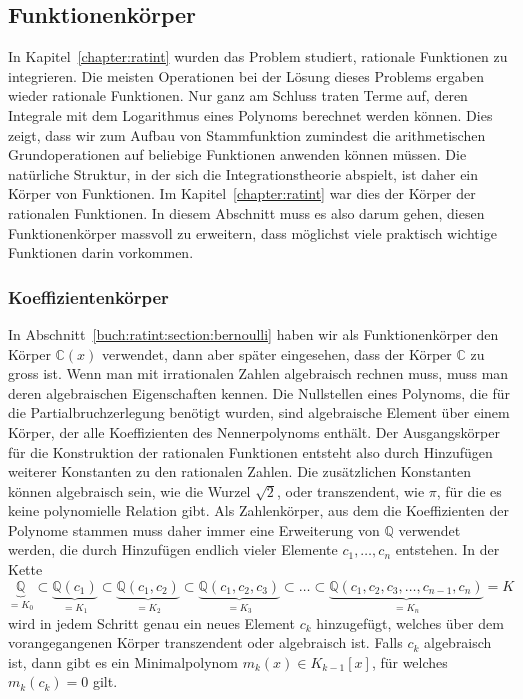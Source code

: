 %
%
\subsection{Funktionenkörper}
In Kapitel~\ref{chapter:ratint} wurden das Problem studiert,
rationale Funktionen zu integrieren.
Die meisten Operationen bei der Lösung dieses Problems ergaben
wieder rationale Funktionen.
Nur ganz am Schluss traten Terme auf, deren Integrale mit dem
Logarithmus eines Polynoms berechnet werden können.
Dies zeigt, dass wir zum Aufbau von Stammfunktion zumindest die
arithmetischen Grundoperationen auf beliebige Funktionen anwenden können
müssen.
Die natürliche Struktur, in der sich die Integrationstheorie
abspielt, ist daher ein Körper von Funktionen.
Im Kapitel~\ref{chapter:ratint} war dies der Körper der rationalen
Funktionen.
In diesem Abschnitt muss es also darum gehen, diesen Funktionenkörper
massvoll zu erweitern, dass möglichst viele praktisch wichtige
Funktionen darin vorkommen.

%
%
\subsubsection{Koeffizientenkörper}
In Abschnitt~\ref{buch:ratint:section:bernoulli} haben wir als
Funktionenkörper den Körper $\mathbb{C}(x)$ verwendet, dann
aber später eingesehen, dass der Körper $\mathbb{C}$ zu gross ist.
Wenn man mit irrationalen Zahlen algebraisch rechnen muss, muss
man deren algebraischen Eigenschaften kennen.
Die Nullstellen eines Polynoms, die für die Partialbruchzerlegung
benötigt wurden, sind algebraische Element über einem Körper, der
alle Koeffizienten des Nennerpolynoms enthält.
Der Ausgangskörper für die Konstruktion der rationalen Funktionen
entsteht also durch Hinzufügen weiterer Konstanten zu den rationalen
Zahlen.
Die zusätzlichen Konstanten können algebraisch sein, wie die
Wurzel $\!\sqrt{2}$, oder transzendent, wie $\pi$, für die es keine
polynomielle Relation gibt.
Als Zahlenkörper, aus dem die Koeffizienten der Polynome stammen
muss daher immer eine Erweiterung von $\mathbb{Q}$ verwendet werden,
die durch Hinzufügen endlich vieler Elemente $c_1,\dots,c_n$ entstehen.
In der Kette
\[
\underbrace{\mathbb{Q}}_{\displaystyle = K_0}
\subset
\underbrace{\mathbb{Q}(c_1)}_{\displaystyle = K_1}
\subset
\underbrace{\mathbb{Q}(c_1,c_2)}_{\displaystyle = K_2}
\subset
\underbrace{\mathbb{Q}(c_1,c_2,c_3)}_{\displaystyle = K_3}
\subset
\ldots
\subset
\underbrace{\mathbb{Q}(c_1,c_2,c_3,\ldots,c_{n-1},c_n)}_{\displaystyle = K_n}
=
K
\]
wird in jedem Schritt genau ein neues Element
$c_k$ hinzugefügt, welches über dem vorangegangenen Körper
transzendent oder algebraisch ist.
Falls $c_k$ algebraisch ist, dann gibt es ein Minimalpolynom
$m_k(x) \in K_{k-1}[x]$, für welches $m_k(c_k)=0$ gilt.

